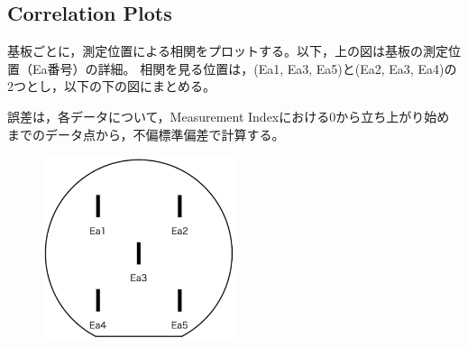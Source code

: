 \documentclass[platex,dvipdfmx,10pt,twoside,a4paper,jis2004]{jsarticle}
\begin{document}
\subsection*{Correlation Plots}
基板ごとに，測定位置による相関をプロットする。以下，上の図は基板の測定位置（Ea番号）の詳細。 相関を見る位置は，(Ea1, Ea3, Ea5)と(Ea2, Ea3, Ea4)の2つとし，以下の下の図にまとめる。
\par
誤差は，各データについて，Measurement Indexにおける0から立ち上がり始めまでのデータ点から，不偏標準偏差で計算する。
\begin{figure}[H]
    \centering
    \includegraphics[width=0.5\textwidth]{BoardSchematic.png}
    \label{fig:BoardSchematic}
\end{figure}
\end{document}
